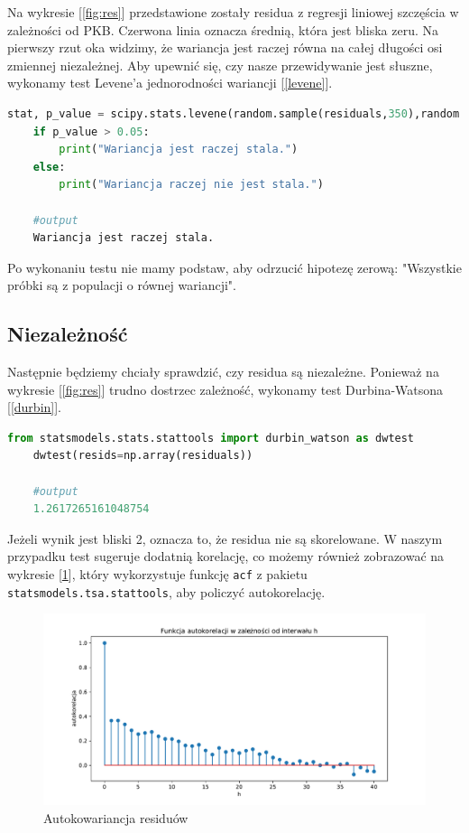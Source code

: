 \documentclass{article}
\theoremstyle{break}
\newcommand{\code}[1]{\colorbox{light-gray}{\texttt{#1}}}
\begin{document}
Na wykresie [\ref{fig:res}] przedstawione zostały residua z regresji liniowej szczęścia w zależności od PKB. Czerwona linia oznacza średnią, która jest bliska zeru. Na pierwszy rzut oka widzimy, że wariancja jest raczej równa na całej długości osi zmiennej niezależnej. Aby upewnić się, czy nasze przewidywanie jest słuszne, wykonamy test Levene'a jednorodności wariancji [\ref{levene}]. 

\begin{lstlisting}[language=Python, caption=Test Levene'a, label={levene}]
	stat, p_value = scipy.stats.levene(random.sample(residuals,350),random.sample(residuals,350))
	if p_value > 0.05:
		print("Wariancja jest raczej stala.")
	else:
		print("Wariancja raczej nie jest stala.")
		
	#output
	Wariancja jest raczej stala.
\end{lstlisting}

Po wykonaniu testu nie mamy podstaw, aby odrzucić hipotezę zerową: "Wszystkie próbki są z populacji o równej wariancji". 

\subsection{Niezależność}

Następnie będziemy chciały sprawdzić, czy residua są niezależne. Ponieważ na wykresie [\ref{fig:res}] trudno dostrzec zależność, wykonamy test Durbina-Watsona [\ref{durbin}].

\begin{lstlisting}[language=Python, caption=Test Durbina-Watsona, label={durbin}]
	from statsmodels.stats.stattools import durbin_watson as dwtest
	dwtest(resids=np.array(residuals))
	
	#output
	1.2617265161048754
\end{lstlisting}

Jeżeli wynik jest bliski 2, oznacza to, że residua nie są skorelowane. W naszym przypadku test sugeruje dodatnią korelację, co możemy również zobrazować na wykresie [\ref{fig:acor}], który wykorzystuje funkcję \code{acf} z pakietu \code{statsmodels.tsa.stattools}, aby policzyć autokorelację.

\begin{figure}[H]
	\begin{center}
		\includegraphics[scale=0.5]{acor.pdf}
		\caption{Autokowariancja residuów}
		\label{fig:acor}
	\end{center}
\end{figure}
\end{document}

